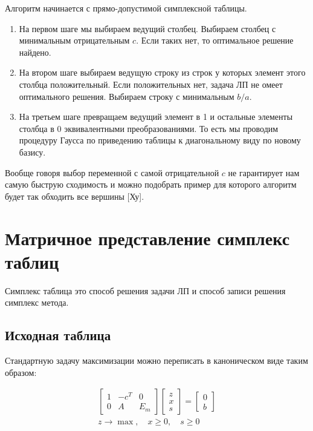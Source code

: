 \documentclass[a4paper,article,14pt]{extarticle}
\begin{document}
Алгоритм начинается с прямо-допустимой симплексной таблицы.

\begin{enumerate}
    \item
        На первом шаге мы выбираем ведущий столбец.
        Выбираем столбец с минимальным отрицательным \(c\).
        Если таких нет, то оптимальное решение найдено.
    \item
        На втором шаге выбираем ведущую строку из строк у которых элемент этого столбца положительный.
        Если положительных нет, задача ЛП не омеет оптимального решения.
        Выбираем строку с минимальным \(b/a\).
    \item
        На третьем шаге превращаем ведущий элемент в 1 и остальные элементы столбца в 0 эквивалентными преобразованиями.
        То есть мы проводим процедуру Гаусса по приведению таблицы к диагональному виду по новому базису.
\end{enumerate}

Вообще говоря выбор переменной с самой отрицательной \(c\) не гарантирует нам самую быструю сходимость и можно подобрать пример для которого алгоритм будет так обходить все вершины [Ху].

\newpage

\section{Матричное представление симплекс таблиц}

Симплекс таблица это способ решения задачи ЛП и способ записи решения симплекс метода.

\subsection{Исходная таблица}

Стандартную задачу максимизации можно переписать в каноническом виде таким образом:

\begin{equation} \label{eq:matrix_form_1_phaze}
    \begin{gathered}
        \begin{bmatrix}
            1 & -c^T & 0 \\
            0 & A & E_m
        \end{bmatrix}
        \begin{bmatrix}
            z \\ x \\ s
        \end{bmatrix}
        =
        \begin{bmatrix}
            0 \\ b
        \end{bmatrix}
        \\
        z \rightarrow \max, \quad x \ge 0, \quad s \ge 0
    \end{gathered}
\end{equation}
\end{document}

